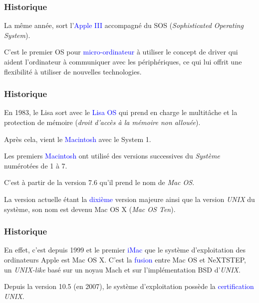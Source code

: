 \documentclass[aspectratio=169]{beamer}
\begin{document}
\begin{frame}
  \frametitle{Historique}
  La même année, sort l'\textcolor{blue}{Apple III} accompagné du SOS
  (\textit{Sophisticated Operating System}).

  \hspace{0.5cm}

  C'est le premier OS pour \textcolor{blue}{micro-ordinateur} à utiliser le
  concept de driver qui aident l’ordinateur à communiquer avec les
  périphériques, ce qui lui offrit une flexibilité à utiliser de nouvelles
  technologies.
\end{frame}

\begin{frame}
  \frametitle{Historique}
  En 1983, le Lisa sort avec le \textcolor{blue}{Lisa OS} qui prend en charge
  le multitâche et la protection de mémoire (\textit{droit d’accès à la mémoire
    non allouée}).

    \hspace{0.5cm}

    Après cela, vient le \textcolor{blue}{Macintosh} avec le System 1.

    \hspace{0.5cm}

    Les premiers \textcolor{blue}{Macintosh} ont
    utilisé des versions successives du \textit{Système} numérotées de 1 à 7.

    \hspace{0.5cm}

    C’est
    à partir de la version 7.6 qu’il prend le nom de \textit{Mac OS}.

    \hspace{0.5cm}

    La version actuelle étant la \textcolor{blue}{dixième} version majeure
    ainsi que la version \textit{UNIX} du système, son nom est devenu Mac OS X
    (\textit{Mac OS Ten}).
\end{frame}

\begin{frame}
  \frametitle{Historique}
  En effet, c'est depuis 1999 et le premier \textcolor{blue}{iMac} que le
  système d'exploitation des ordinateurs Apple est Mac OS X. C'est la
  \textcolor{blue}{fusion} entre Mac OS et NeXTSTEP, un \textit{UNIX-like} basé sur un
  noyau Mach et sur l’implémentation BSD d’\textit{UNIX}.

  \hspace{0.5cm}

  Depuis la version 10.5 (en 2007), le système d’exploitation possède la
  \textcolor{blue}{certification} \textit{UNIX}.
\end{frame}
\end{document}
